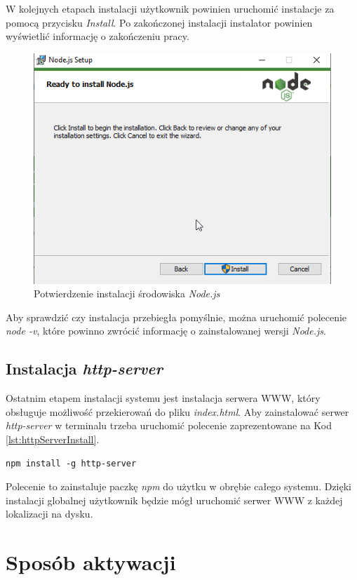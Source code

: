 \documentclass[a4paper,twoside,12pt]{book}
\begin{document}
{W kolejnych etapach instalacji użytkownik powinien uruchomić instalacje za pomocą przycisku \textit{Install}. Po zakończonej instalacji instalator powinien wyświetlić informację o zakończeniu pracy.
\begin{figure}[h!]
	\centering
	\includegraphics[width=0.55\linewidth]{../zrzuty_ekranu/instalacja_nodejs/node6}
	\caption{Potwierdzenie instalacji środowiska \textit{Node.js}}
	\label{fig:node6}
\end{figure}
\FloatBarrier

Aby sprawdzić czy instalacja przebiegła pomyślnie, można uruchomić polecenie \textit{node -v}, które powinno zwrócić informację o zainstalowanej wersji \textit{Node.js}.

\subsection {Instalacja \textit{http-server}}
Ostatnim etapem instalacji systemu jest instalacja serwera WWW, który obsługuje możliwość przekierowań do pliku \textit{index.html}. Aby zainstalować serwer \textit{http-server} w terminalu trzeba uruchomić polecenie zaprezentowane na Kod \ref{lst:httpServerInstall}.
\begin{lstlisting}[caption={Instalacja paczki \textit{http-server}}, label={lst:httpServerInstall}]
	npm install -g http-server
\end{lstlisting}

Polecenie to zainstaluje paczkę \textit{npm} do użytku w obrębie całego systemu. Dzięki instalacji globalnej użytkownik będzie mógł uruchomić serwer WWW z każdej lokalizacji na dysku.

\section {Sposób aktywacji}
}
\end{document}
